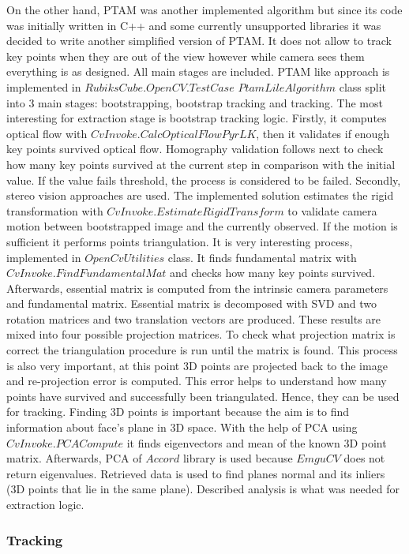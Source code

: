 \documentclass[../../main.tex]{subfiles}
\begin{document}
On the other hand, \ac{PTAM} was another implemented algorithm but since its code was initially written in C++ and some currently unsupported libraries it was decided to write another simplified version of \ac{PTAM}. It does not allow to track key points when they are out of the view however while camera sees them everything is as designed. All main stages are included. \ac{PTAM} like approach is implemented in $RubiksCube.OpenCV.TestCase$ $PtamLileAlgorithm$ class split into 3 main stages: bootstrapping, bootstrap tracking and tracking. The most interesting for extraction stage is bootstrap tracking logic. Firstly, it computes optical flow with $CvInvoke.CalcOpticalFlowPyrLK$, then it validates if enough key points survived optical flow. Homography validation follows next to check how many key points survived at the current step in comparison with the initial value. If the value fails threshold, the process is considered to be failed. Secondly, stereo vision approaches are used. The implemented solution estimates the rigid transformation with $CvInvoke.EstimateRigidTransform$ to validate camera motion between bootstrapped image and the currently observed. If the motion is sufficient it performs points triangulation. It is very interesting process, implemented in $OpenCvUtilities$ class. It finds fundamental matrix with $CvInvoke.FindFundamentalMat$ and checks how many key points survived. Afterwards, essential matrix is computed from the intrinsic camera parameters and fundamental matrix. Essential matrix is decomposed with \ac{SVD} and two rotation matrices and two translation vectors are produced. These results are mixed into four possible projection matrices. To check what projection matrix is correct the triangulation procedure is run until the matrix is found. This process is also very important, at this point 3D points are projected back to the image and re-projection error is computed. This error helps to understand how many points have survived and successfully been triangulated. Hence, they can be used for tracking. Finding 3D points is important because the aim is to find information about face's plane in 3D space. With the help of \ac{PCA} using $CvInvoke.PCACompute$ it finds eigenvectors and mean of the known 3D point matrix. Afterwards, \ac{PCA} of $Accord$ library is used because $EmguCV$ does not return eigenvalues. Retrieved data is used to find planes normal and its inliers (3D points that lie in the same plane). Described analysis is what was needed for extraction logic.

\subsubsection*{Tracking}
\end{document}
